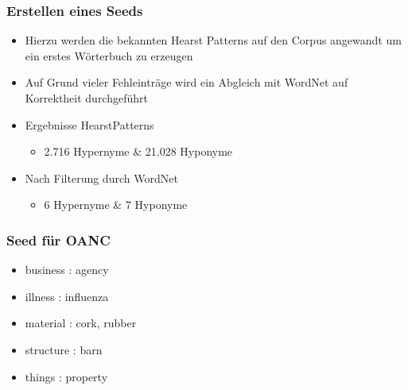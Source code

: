 \begin{frame}
  \frametitle{Erstellen eines Seeds}
  
  \begin{itemize}
    \item Hierzu werden die bekannten Hearst Patterns auf den Corpus angewandt um ein erstes Wörterbuch zu erzeugen
    \item Auf Grund vieler Fehleinträge wird ein Abgleich mit WordNet auf Korrektheit durchgeführt
    \item Ergebnisse HearstPatterns
    \begin{itemize}
      \item 2.716 Hypernyme \& 21.028 Hyponyme
    \end{itemize}
    \item Nach Filterung durch WordNet
    \begin{itemize}
      \item 6 Hypernyme \& 7 Hyponyme
    \end{itemize}
  \end{itemize}
\end{frame}

\begin{frame}
  \frametitle{Seed für OANC}
  \begin{itemize}
    \item business  : agency
    \item illness   : influenza
    \item material  : cork, rubber
    \item structure : barn
    \item things    : property
  \end{itemize}
\end{frame}
